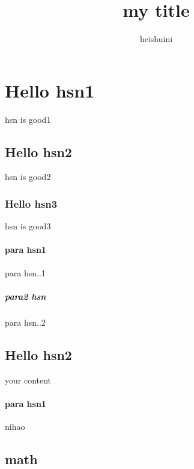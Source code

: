 \documentclass[11pt,a4paper,twocolumn]{article}
\begin{document}
  
\title{my title}
\author{heishuini}
\date{}
\maketitle    

    \tableofcontents 
    \section{Hello hsn1} hsn is good1
        \subsection{Hello hsn2} hsn is good2
            \subsubsection{Hello hsn3} hsn is good3
                \paragraph{para hsn1} para hsn..1
                    \subparagraph{para2 hsn} para hsn..2
        \subsection{Hello hsn2} 
            your content
            \paragraph{para hsn1} nihao 
    \subsection{math}
\end{document}
